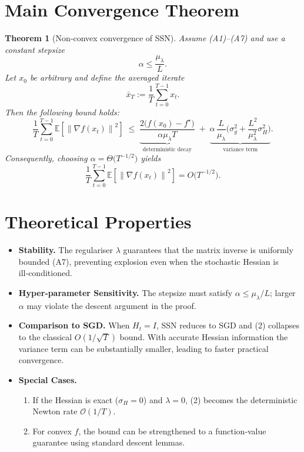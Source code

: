 \documentclass{article}
\newtheorem{theorem}{Theorem}
\newcommand{\E}{\mathbb{E}}
\newcommand{\norm}[1]{\left\|#1\right\|}
\begin{document}
\section*{Main Convergence Theorem}
\begin{theorem}[Non‑convex convergence of SSN]\label{thm:main}
Assume (A1)–(A7) and use a constant stepsize 
\[
\alpha\le \frac{\mu_{\lambda}}{L}.
\]
Let $x_{0}$ be arbitrary and define the averaged iterate
\[
\bar x_{T}:=\frac{1}{T}\sum_{t=0}^{T-1}x_{t}.
\]
Then the following bound holds:
\[
\frac{1}{T}\sum_{t=0}^{T-1}\E\!\left[\norm{\nabla f(x_{t})}^{2}\right]
\;\le\;
\underbrace{\frac{2\big(f(x_{0})-f^{\star}\big)}{\alpha\mu_{\lambda} T}}_{\text{deterministic decay}}
\;+\;
\underbrace{\alpha\,\frac{L}{\mu_{\lambda}}\Big(\sigma_{g}^{2}+ \frac{L^{2}}{\mu_{\lambda}^{2}}\sigma_{H}^{2}\Big)}_{\text{variance term}} .
\tag{2}
\]
Consequently, choosing $\alpha = \Theta\!\big(T^{-1/2}\big)$ yields
\[
\frac{1}{T}\sum_{t=0}^{T-1}\E\!\left[\norm{\nabla f(x_{t})}^{2}\right]=O\!\big(T^{-1/2}\big).
\]
\end{theorem}

\section*{Theoretical Properties}
\begin{itemize}
\item \textbf{Stability.} The regulariser $\lambda$ guarantees that the matrix inverse is uniformly bounded (A7), preventing explosion even when the stochastic Hessian is ill‑conditioned.
\item \textbf{Hyper‑parameter Sensitivity.} The stepsize must satisfy $\alpha\le \mu_{\lambda}/L$; larger $\alpha$ may violate the descent argument in the proof.
\item \textbf{Comparison to SGD.} When $H_{t}=I$, SSN reduces to SGD and (2) collapses to the classical $O(1/\sqrt{T})$ bound. With accurate Hessian information the variance term can be substantially smaller, leading to faster practical convergence.
\item \textbf{Special Cases.}
\begin{enumerate}
\item If the Hessian is exact ($\sigma_{H}=0$) and $\lambda=0$, (2) becomes the deterministic Newton rate $\mathcal{O}(1/T)$.
\item For convex $f$, the bound can be strengthened to a function‑value guarantee using standard descent lemmas.
\end{enumerate}
\end{itemize}
\end{document}

